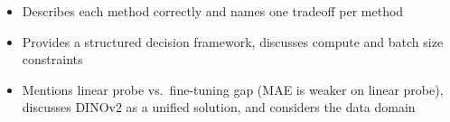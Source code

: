 \begin{interviewq}

\goodgreat
\begin{itemize}
    \item {} Describes each method correctly and names one tradeoff per method
    \item {} Provides a structured decision framework, discusses compute and batch size constraints
    \item {} Mentions linear probe vs.\ fine-tuning gap (MAE is weaker on linear probe), discusses DINOv2 as a unified solution, and considers the data domain
\end{itemize}

\end{interviewq}


